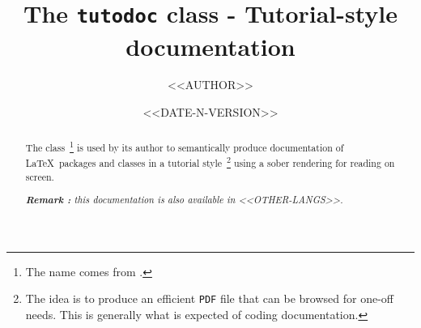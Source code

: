 \documentclass[12pt, a4paper]{tutodoc}
\begin{document}
\title{The \texttt{tutodoc} class - Tutorial-style documentation}
\author{<<AUTHOR>>}
\date{<<DATE-N-VERSION>>}

\maketitle

\begin{abstract}
    The \thisproj{} class\,%
    \footnote{
        The name comes from .
    }
    is used by its author to semantically produce documentation of \LaTeX\ packages and classes in a tutorial style\,%
    \footnote{
        The idea is to produce an efficient \texttt{PDF} file that can be browsed for one-off needs. This is generally what is expected of coding documentation.
    }
    using a sober rendering for reading on screen.

    \smallskip

	\noindent
    \emph{\textbf{Remark :} this documentation is also available in <<OTHER-LANGS>>.}
\end{abstract}
\end{document}
